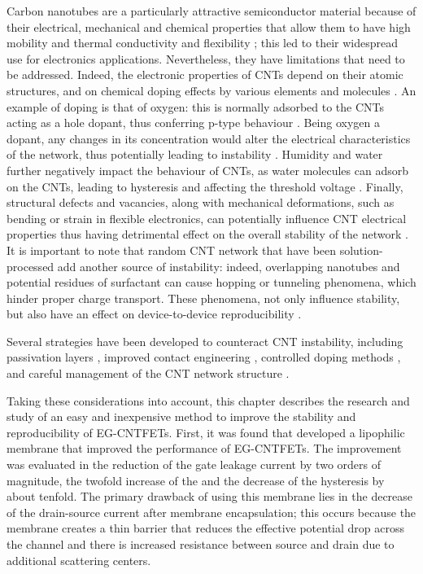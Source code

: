 Carbon nanotubes are a particularly attractive semiconductor material because of
their electrical, mechanical and chemical properties that allow them to have
high mobility and thermal conductivity and flexibility
\citep{joshiUnderstanding2018}; this led to their widespread use for electronics
applications. Nevertheless, they have limitations that need to be addressed.
Indeed, the electronic properties of CNTs depend on their atomic structures, and
on chemical doping effects by various elements and molecules
\citep{daiCarbon2002}. An example of doping is that of oxygen: this is normally
adsorbed to the CNTs acting as a hole dopant, thus conferring p-type behaviour
\citep{daiCarbon2002,mceuenSinglewalled2002}. Being oxygen a dopant, any changes
in its concentration would alter the electrical characteristics of the network,
thus potentially leading to instability \citep{mceuenSinglewalled2002}. Humidity
and water further negatively impact the behaviour of CNTs, as water molecules
can adsorb on the CNTs, leading to hysteresis and affecting the threshold
voltage \citep{mceuenSinglewalled2002, kimHysteresis2003,
zaumseilSemiconducting2019}. Finally, structural defects and vacancies, along
with mechanical deformations, such as bending or strain in flexible electronics,
can potentially influence CNT electrical properties thus having  detrimental
effect on the overall stability of the network
\citep{daiCarbon2002,rodriguez-manzoCreation2009}. It is important to note that
random CNT network that have been solution-processed add another source of
instability: indeed, overlapping nanotubes and potential residues of surfactant
can cause hopping or tunneling phenomena, which hinder proper charge transport.
These phenomena, not only influence stability, but also have an effect on
device-to-device reproducibility \citep{zaumseilSemiconducting2019}.

Several strategies have been developed to counteract CNT instability, including
passivation layers \citep{avourisMolecular2002,molazemhosseiniRapidly2021},
improved contact engineering
\citep{avourisMolecular2002,javeyCarbon2004,naderiReview2016}, controlled doping
methods \citep{avourisMolecular2002,naderiReview2016}, and careful management of
the CNT network structure
\citep{zaumseilSemiconducting2019,shkodraElectrolytegated2021}.

Taking these considerations into account, this chapter describes the research
and study of an easy and inexpensive method to improve the stability and
reproducibility of EG-CNTFETs. First, it was found that \citet{joshiUsing2018}
developed a lipophilic membrane that improved the performance of EG-CNTFETs. The
improvement was evaluated in the reduction of the gate leakage current by two
orders of magnitude, the twofold increase of the \ratio{} and the decrease of
the hysteresis by about tenfold. The primary drawback of using this membrane
lies in the decrease of the drain-source current after membrane encapsulation;
this occurs because the membrane creates a thin barrier that reduces the
effective potential drop across the channel and there is increased resistance
between source and drain due to additional scattering centers.

